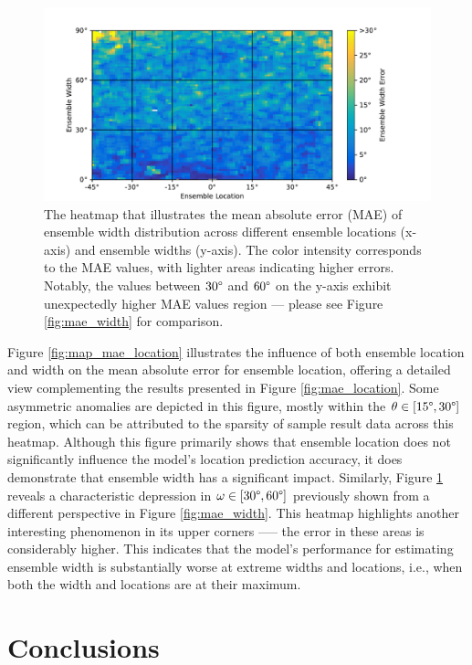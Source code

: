 \documentclass{article}
\begin{document}
\begin{figure}[ht]
  \centering
  \includegraphics[width=\linewidth]{../figures/map_mae_width.pdf}
  \caption{\label{fig:map_mae_width}The heatmap that illustrates the mean absolute error (MAE) of ensemble width distribution across different ensemble locations (x-axis) and ensemble widths (y-axis). The color intensity corresponds to the MAE values, with lighter areas indicating higher errors. Notably, the values between $30\degree$ and $60\degree$ on the y-axis exhibit unexpectedly higher MAE values region --- please see Figure \ref{fig:mae_width} for comparison. }
\end{figure}

Figure \ref{fig:map_mae_location} illustrates the influence of both ensemble location and width on the mean absolute error for ensemble location, offering a detailed view complementing the results presented in Figure \ref{fig:mae_location}. Some asymmetric anomalies are depicted in this figure, mostly within the $\theta \in [15\degree, 30\degree]$ region, which can be attributed to the sparsity of sample result data across this heatmap. Although this figure primarily shows that ensemble location does not significantly influence the model's location prediction accuracy, it does demonstrate that ensemble width has a significant impact. Similarly, Figure \ref{fig:map_mae_width} reveals a characteristic depression in $\omega \in [30\degree, 60\degree]$ previously shown from a different perspective in Figure \ref{fig:mae_width}. This heatmap highlights another interesting phenomenon in its upper corners --— the error in these areas is considerably higher. This indicates that the model's performance for estimating ensemble width is substantially worse at extreme widths and locations, i.e., when both the width and locations are at their maximum.

\section{Conclusions}
\label{sec:conclusions}
\end{document}

